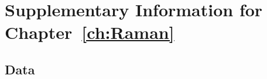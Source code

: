 \chapter{Supplementary Information for Chapter~\ref{ch:Raman}}
\label{appendix: Raman}
\acresetall

\section{Data}
